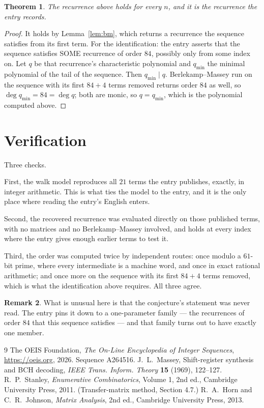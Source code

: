 \documentclass[11pt,a4paper]{article}
\theoremstyle{plain}
\newtheorem{theorem}{Theorem}
\theoremstyle{definition}
\newtheorem{remark}[theorem]{Remark}
\begin{document}
\begin{theorem}
The recurrence above holds for every $n$, and it is the recurrence the entry records.
\end{theorem}

\begin{proof}
It holds by Lemma~\ref{lem:bm}, which returns a recurrence the sequence satisfies from its
first term. For the identification: the entry asserts that the sequence satisfies SOME
recurrence of order $84$, possibly only from some index on. Let $q$ be that recurrence's
characteristic polynomial and $q_{\min}$ the minimal polynomial of the tail of the sequence.
Then $q_{\min}\mid q$. Berlekamp--Massey run on the sequence with its first $84+4$ terms
removed returns order $84$ as well, so $\deg q_{\min}=84=\deg q$; both are monic, so
$q=q_{\min}$, which is the polynomial computed above.
\end{proof}

\section{Verification}

Three checks.

First, the walk model reproduces all $21$ terms the entry publishes, exactly, in integer
arithmetic. This is what ties the model to the entry, and it is the only place where reading
the entry's English enters.

Second, the recovered recurrence was evaluated directly on those published terms, with no
matrices and no Berlekamp--Massey involved, and holds at every index where the entry gives
enough earlier terms to test it.

Third, the order was computed twice by independent routes: once modulo a $61$-bit prime, where
every intermediate is a machine word, and once in exact rational arithmetic; and once more on
the sequence with its first $84+4$ terms removed, which is what the identification above
requires. All three agree.

\begin{remark}
What is unusual here is that the conjecture's statement was never read. The entry pins it down
to a one-parameter family --- the recurrences of order $84$ that this sequence satisfies
--- and that family turns out to have exactly one member.
\end{remark}

\begin{thebibliography}{9}
 The OEIS Foundation, \emph{The On-Line Encyclopedia of Integer
Sequences}, \url{https://oeis.org}, 2026. Sequence A264516.
 J.~L.~Massey, Shift-register synthesis and BCH decoding, \emph{IEEE
Trans. Inform. Theory} \textbf{15} (1969), 122--127.
 R.~P.~Stanley, \emph{Enumerative Combinatorics}, Volume 1, 2nd ed.,
Cambridge University Press, 2011. (Transfer-matrix method, Section 4.7.)
 R.~A.~Horn and C.~R.~Johnson, \emph{Matrix Analysis}, 2nd ed., Cambridge
University Press, 2013.
\end{thebibliography}
\end{document}
